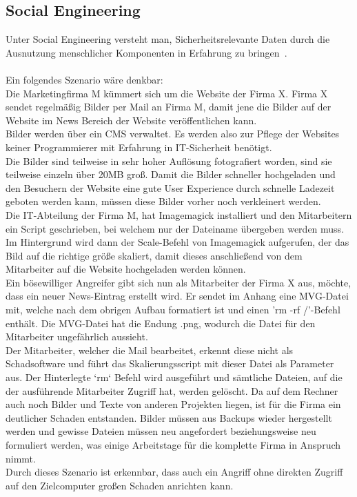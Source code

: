 \newpage
\subsection{Social Engineering}\label{subsec:social-engineering}

Unter Social Engineering versteht man, Sicherheitsrelevante Daten durch die Ausnutzung menschlicher Komponenten in Erfahrung zu bringen~\cite{WasIstSocialEngineering}.\\\\

Ein folgendes Szenario wäre denkbar:\\

Die Marketingfirma M kümmert sich um die Website der Firma X. Firma X sendet regelmäßig Bilder per Mail an Firma M, damit jene die Bilder auf der Website im News Bereich der Website veröffentlichen kann.\\

Bilder werden über ein CMS verwaltet.
Es werden also zur Pflege der Websites keiner Programmierer mit Erfahrung in IT-Sicherheit benötigt.\\

Die Bilder sind teilweise in sehr hoher Auflösung fotografiert worden, sind sie teilweise einzeln über 20MB groß.
Damit die Bilder schneller hochgeladen und den Besuchern der Website eine gute User Experience durch schnelle Ladezeit geboten werden kann, müssen diese Bilder vorher noch verkleinert werden.\\

Die IT-Abteilung der Firma M, hat Imagemagick installiert und den Mitarbeitern ein Script geschrieben, bei welchem nur der Dateiname übergeben werden muss.
Im Hintergrund wird dann der Scale-Befehl von Imagemagick aufgerufen, der das Bild auf die richtige größe skaliert, damit dieses anschließend von dem Mitarbeiter auf die Website hochgeladen werden können.\\

Ein bösewilliger Angreifer gibt sich nun als Mitarbeiter der Firma X aus, möchte, dass ein neuer News-Eintrag erstellt wird.
Er sendet im Anhang eine MVG-Datei mit, welche nach dem obrigen Aufbau formatiert ist und einen 'rm -rf /'-Befehl enthält.
Die MVG-Datei hat die Endung .png, wodurch die Datei für den Mitarbeiter ungefährlich aussieht.\\

Der Mitarbeiter, welcher die Mail bearbeitet, erkennt diese nicht als Schadsoftware und führt das Skalierungsscript mit dieser Datei als Parameter aus.
Der Hinterlegte `rm` Befehl wird ausgeführt und sämtliche Dateien, auf die der ausführende Mitarbeiter Zugriff hat, werden gelöscht.
Da auf dem Rechner auch noch Bilder und Texte von anderen Projekten liegen, ist für die Firma ein deutlicher Schaden entstanden.
Bilder müssen aus Backups wieder hergestellt werden und gewisse Dateien müssen neu angefordert beziehungsweise neu formuliert werden, was einige Arbeitstage für die komplette Firma in Anspruch nimmt.\\

Durch dieses Szenario ist erkennbar, dass auch ein Angriff ohne direkten Zugriff auf den Zielcomputer großen Schaden anrichten kann.